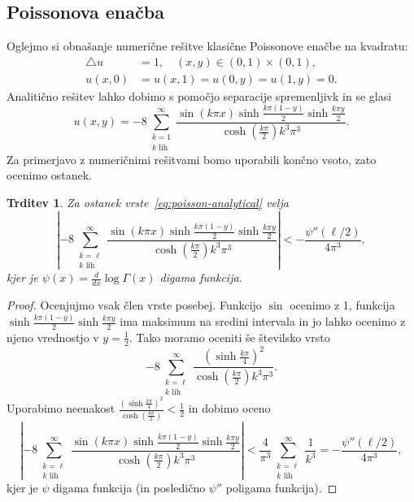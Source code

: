 \documentclass[12pt,a4paper,twoside]{article}
\theoremstyle{definition} %
\theoremstyle{plain} %
\newtheorem{trditev}[definicija]{Trditev}
\numberwithin{equation}{section}
\newcommand{\lap}{\triangle}
\newcommand{\dd}[2]{\ensuremath{\frac{d #1}{d #2}}}
\newcommand{\ddx}[1]{\dd{#1}{x}}
\begin{document}
\subsection{Poissonova enačba}
Oglejmo si obnašanje numerične rešitve klasične Poissonove enačbe na kvadratu:
\begin{align}
  \lap u &= 1, \quad (x, y) \in (0, 1) \times (0, 1),
  \label{eq:poisson-problem} \\
  u(x, 0) &= u(x, 1) = u(0, y) = u(1, y) = 0. \nonumber
\end{align}
Analitično rešitev lahko dobimo s pomočjo separacije spremenljivk in se glasi
\begin{equation}
  u(x, y) =
  -8 \sum_{\substack{k=1 \\ k \text{ lih}}}^\infty \frac{ \sin (k \pi  x) \sinh
  \frac{k \pi  (1-y)}{2} \sinh \frac{k \pi
y}{2}}{\cosh(\frac{k\pi}{2})k^3 \pi ^3}.
  \label{eq:poisson-analytical}
\end{equation}
Za primerjavo z numeričnimi rešitvami bomo uporabili končno vsoto, zato ocenimo
ostanek.
\begin{trditev}
  Za ostanek vrste~\eqref{eq:poisson-analytical} velja
  \begin{equation}
    \left|-8 \sum_{\substack{k=\ell \\ k \text{ lih}}}^\infty \frac{ \sin (k \pi  x) \sinh
      \frac{k \pi  (1-y)}{2} \sinh \frac{k \pi y}{2}}{\cosh(\frac{k\pi}{2})k^3
      \pi ^3}\right| < -\frac{\psi''(\ell/2)}{4 \pi^3},
  \end{equation}
  kjer je $\psi(x) = \ddx{}\log\Gamma(x)$ digama funkcija.
\end{trditev}
\begin{proof}
Ocenjujmo vsak člen vrste posebej. Funkcijo $\sin$ ocenimo z 1, funkcija
$\sinh \frac{k \pi  (1-y)}{2} \sinh \frac{k \pi y}{2}$ ima maksimum na sredini
intervala in jo lahko ocenimo z njeno vrednostjo v $y = \frac{1}{2}$.
Tako moramo oceniti še številsko vrsto
\[
    -8 \sum_{\substack{k=\ell \\ k \text{ lih}}}^\infty
    \frac{\left(\sinh\frac{k \pi}{4}\right)^2}{\cosh(\frac{k\pi}{2})k^3
    \pi ^3} .
\]
Uporabimo neenakost $\frac{\left(\sinh\frac{k
\pi}{4}\right)^2}{\cosh(\frac{k\pi}{2})} < \frac{1}{2}$ in dobimo oceno
\[
\left|-8 \sum_{\substack{k=\ell \\ k \text{ lih}}}^\infty \frac{ \sin (k \pi  x) \sinh
      \frac{k \pi  (1-y)}{2} \sinh \frac{k \pi y}{2}}{\cosh(\frac{k\pi}{2})k^3
      \pi ^3}\right| < \frac{4}{\pi^3} \sum_{\substack{k=\ell \\ k \text{ lih}}}^\infty
      \frac{1}{k^3} = -\frac{\psi''(\ell/2)}{4 \pi^3},
\]
kjer je $\psi$ digama funkcija (in posledično $\psi''$ poligama funkcija).
\end{proof}
\end{document}
